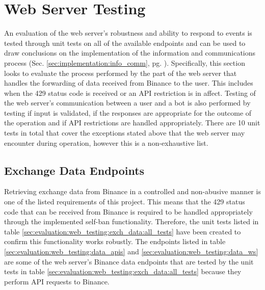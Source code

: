 \noindent 




\section{Web Server Testing}
\label{sec:evaluation:web_server}

\noindent An evaluation of the web server's robustness and ability to respond to events is tested through unit tests on all of the available endpoints and can be used to draw conclusions on the implementation of the information and communications process (Sec. \ref{sec:implementation:info_comm}, pg. \pageref{sec:implementation:info_comm}). Specifically, this section looks to evaluate the process performed by the part of the web server that handles the forwarding of data received from Binance to the user. This includes when the 429 status code is received or an API restriction is in affect. Testing of the web server's communication between a user and a bot is also performed by testing if input is validated, if the responses are appropriate for the outcome of the operation and if API restrictions are handled appropriately. There are 10 unit tests in total that cover the exceptions stated above that the web server may encounter during operation, however this is a non-exhaustive list.


\subsection{Exchange Data Endpoints}
\label{sec:evaluation:web_server:exch_data}

\noindent Retrieving exchange data from Binance in a controlled and non-abusive manner is one of the listed requirements of this project. This means that the 429 status code that can be received from Binance is required to be handled appropriately through the implemented self-ban functionality. Therefore, the unit tests listed in table \ref{sec:evaluation:web_testing:exch_data:all_tests} have been created to confirm this functionality works robustly. The endpoints listed in table \ref{sec:evaluation:web_testing:data_apis} and \ref{sec:evaluation:web_testing:data_ws} are some of the web server's Binance data endpoints that are tested by the unit tests in table \ref{sec:evaluation:web_testing:exch_data:all_tests} because they perform API requests to Binance. 

